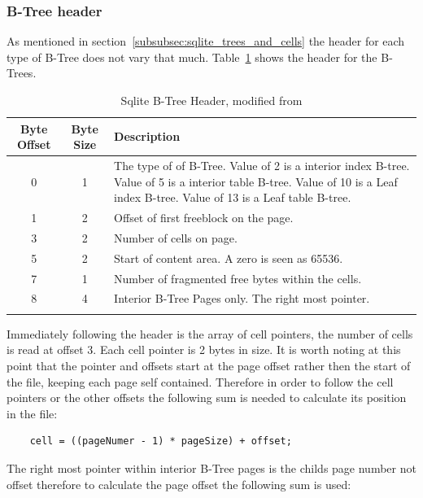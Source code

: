 \subsubsection{B-Tree header}
\label{subsubsec:btree_header}

As mentioned in section~\ref{subsubsec:sqlite_trees_and_cells} the header for each type of B-Tree does not vary that much. Table~\ref{tbl:btree_header} shows the header for the B-Trees.

\begin{longtable}[h]{| c | c | p{10cm} |}
		\hline
			\textbf{Byte Offset} & \textbf{Byte Size} & \textbf{Description} \\ 
		\hline
		\endhead
			0 & 1 & The type of of B-Tree. \newline
			Value of 2 is a interior index B-tree. \newline
			Value of 5 is a interior table B-tree. \newline
			Value of 10 is a Leaf index B-tree. \newline
			Value of 13 is a Leaf table B-tree. \\
		\hline
			1 & 2 & Offset of first freeblock on the page. \\
		\hline
			3 & 2 & Number of cells on page. \\
		\hline
			5 & 2 & Start of content area. A zero is seen as 65536. \\
		\hline
			7 & 1 & Number of fragmented free bytes within the cells. \\
		\hline
			8 & 4 & Interior B-Tree Pages only. The right most pointer. \\ 
		\hline
	\caption{Sqlite B-Tree Header, modified from \cite{sqlite}}
	\label{tbl:btree_header}
\end{longtable}

Immediately following the header is the array of cell pointers, the number of cells is read at offset 3. Each cell pointer is 2 bytes in size. It is worth noting at this point that the pointer and offsets start at the page offset rather then the start of the file, keeping each page self contained. Therefore in order to follow the cell pointers or the other offsets the following sum is needed to calculate its position in the file: 

\begin{lstlisting}	
	cell = ((pageNumer - 1) * pageSize) + offset;
\end{lstlisting}

The right most pointer within interior B-Tree pages is the childs page number not offset therefore to calculate the page offset the following sum is used:

